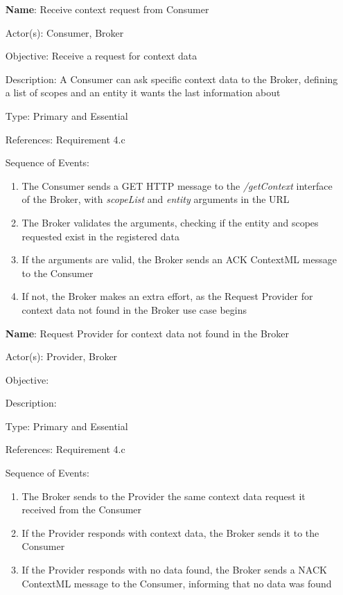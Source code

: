 \begin{itemize}
	\item[\textbf{Name}:] Receive context request from Consumer
	\item[Actor(s):] Consumer, Broker
	\item[Objective:] Receive a request for context data
	\item[Description:] A Consumer can ask specific context data to the Broker, defining a list of scopes and an entity it wants the last information about
	\item[Type:] Primary and Essential
	\item[References:] Requirement 4.c
	\item[Sequence of Events:]\hfill
	\begin{enumerate}
		\item The Consumer sends a GET HTTP message to the \textit{/getContext} interface of the Broker, with \textit{scopeList} and \textit{entity} arguments in the URL
		\item The Broker validates the arguments, checking if the entity and scopes requested exist in the registered data
		\item If the arguments are valid, the Broker sends an ACK ContextML message to the Consumer
		\item If not, the Broker makes an extra effort, as the Request Provider for context data not found in the Broker use case begins
	\end{enumerate}
\end{itemize}

\begin{itemize}
	\item[\textbf{Name}:] Request Provider for context data not found in the Broker
	\item[Actor(s):] Provider, Broker
	\item[Objective:]
	\item[Description:]
	\item[Type:] Primary and Essential
	\item[References:] Requirement 4.c
	\item[Sequence of Events:]\hfill
	\begin{enumerate}
		\item The Broker sends to the Provider the same context data request it received from the Consumer
		\item If the Provider responds with context data, the Broker sends it to the Consumer
		\item If the Provider responds with no data found, the Broker sends a NACK ContextML message to the Consumer, informing that no data was found
	\end{enumerate}
\end{itemize}


